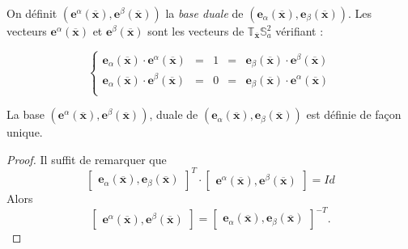 \begin{definition}
On définit $(\mathbf{e}^{\alpha}(\overline{\mathbf{x}}), \mathbf{e}^{\beta}(\overline{\mathbf{x}}))$ la \textit{base duale} de $(\mathbf{e}_{\alpha}(\overline{\mathbf{x}}), \mathbf{e}_{\beta}(\overline{\mathbf{x}}))$.
Les vecteurs $\mathbf{e}^{\alpha}(\overline{\mathbf{x}})$ et $\mathbf{e}^{\beta}(\overline{\mathbf{x}})$ sont les vecteurs de $\mathbb{T}_{\overline{\mathbf{x}}}\mathbb{S}_a^2$ vérifiant :

\begin{equation}
\left\lbrace
\begin{array}{rcccl}
\mathbf{e}_{\alpha}(\overline{\mathbf{x}}) \cdot \mathbf{e}^{\alpha}(\overline{\mathbf{x}}) & = & 1 & = & \mathbf{e}_{\beta}(\overline{\mathbf{x}}) \cdot \mathbf{e}^{\beta}(\overline{\mathbf{x}}) \\
\mathbf{e}_{\alpha}(\overline{\mathbf{x}}) \cdot \mathbf{e}^{\beta}(\overline{\mathbf{x}}) & = & 0 & = & \mathbf{e}_{\beta}(\overline{\mathbf{x}}) \cdot \mathbf{e}^{\alpha}(\overline{\mathbf{x}}) \\
\end{array}
\right.
\label{eq: dualite alpha beta}
\end{equation}
\end{definition}

\begin{proposition}
La base $(\mathbf{e}^{\alpha}(\overline{\mathbf{x}}), \mathbf{e}^{\beta}(\overline{\mathbf{x}}))$, duale de $(\mathbf{e}_{\alpha}(\overline{\mathbf{x}}), \mathbf{e}_{\beta}(\overline{\mathbf{x}}))$ est définie de façon unique.
\end{proposition}

\begin{proof}
Il suffit de remarquer que
\begin{equation}
\begin{bmatrix}
\mathbf{e}_{\alpha}(\overline{\mathbf{x}}) , \mathbf{e}_{\beta}(\overline{\mathbf{x}})
\end{bmatrix}^T \cdot 
\begin{bmatrix}
\mathbf{e}^{\alpha}(\overline{\mathbf{x}}) , \mathbf{e}^{\beta}(\overline{\mathbf{x}})
\end{bmatrix} = Id
\end{equation}
Alors 
\begin{equation}
\begin{bmatrix}
\mathbf{e}^{\alpha}(\overline{\mathbf{x}}) , \mathbf{e}^{\beta}(\overline{\mathbf{x}})
\end{bmatrix} = 
\begin{bmatrix}
\mathbf{e}_{\alpha}(\overline{\mathbf{x}}) , \mathbf{e}_{\beta}(\overline{\mathbf{x}})
\end{bmatrix}^{-T}.
\end{equation}
\end{proof}

